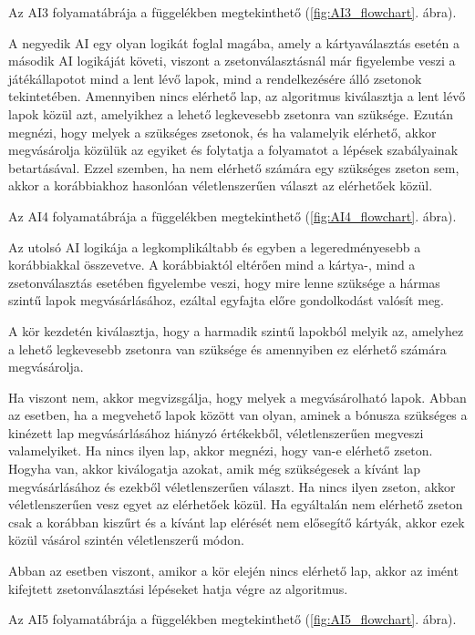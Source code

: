 Az AI3 folyamatábrája a függelékben megtekinthető (\ref{fig:AI3_flowchart}. ábra).



A negyedik AI egy olyan logikát foglal magába, amely a kártyaválasztás esetén a második AI logikáját követi, viszont a zsetonválasztásnál már figyelembe veszi a játékállapotot mind a lent lévő lapok, mind a rendelkezésére álló zsetonok tekintetében. Amennyiben nincs elérhető lap, az algoritmus kiválasztja a lent lévő lapok közül azt, amelyikhez a lehető legkevesebb zsetonra van szüksége. Ezután megnézi, hogy melyek a szükséges zsetonok, és ha valamelyik elérhető, akkor megvásárolja közülük az egyiket és folytatja a folyamatot a lépések szabályainak betartásával. Ezzel szemben, ha nem elérhető számára egy szükséges zseton sem, akkor a korábbiakhoz hasonlóan véletlenszerűen választ az elérhetőek közül.

Az AI4 folyamatábrája a függelékben megtekinthető (\ref{fig:AI4_flowchart}. ábra).


Az utolsó AI logikája a legkomplikáltabb és egyben a legeredményesebb a korábbiakkal összevetve. A korábbiaktól eltérően mind a kártya-, mind a zsetonválasztás esetében figyelembe veszi, hogy mire lenne szüksége a hármas szintű lapok megvásárlásához, ezáltal egyfajta előre gondolkodást valósít meg.

A kör kezdetén kiválasztja, hogy a harmadik szintű lapokból melyik az, amelyhez a lehető legkevesebb zsetonra van szüksége és amennyiben ez elérhető számára megvásárolja.

Ha viszont nem, akkor megvizsgálja, hogy melyek a megvásárolható lapok. Abban az esetben, ha a megvehető lapok között van olyan, aminek a bónusza szükséges a kinézett lap megvásárlásához hiányzó értékekből, véletlenszerűen megveszi valamelyiket. Ha nincs ilyen lap, akkor megnézi, hogy van-e elérhető zseton. Hogyha van, akkor kiválogatja azokat, amik még szükségesek a kívánt lap megvásárlásához és ezekből véletlenszerűen választ. Ha nincs ilyen zseton, akkor véletlenszerűen vesz egyet az elérhetőek közül. Ha egyáltalán nem elérhető zseton csak a korábban kiszűrt és a kívánt lap elérését nem elősegítő kártyák, akkor ezek közül vásárol szintén véletlenszerű módon.

Abban az esetben viszont, amikor a kör elején nincs elérhető lap, akkor az imént kifejtett zsetonválasztási lépéseket hatja végre az algoritmus.

Az AI5 folyamatábrája a függelékben megtekinthető (\ref{fig:AI5_flowchart}. ábra).

